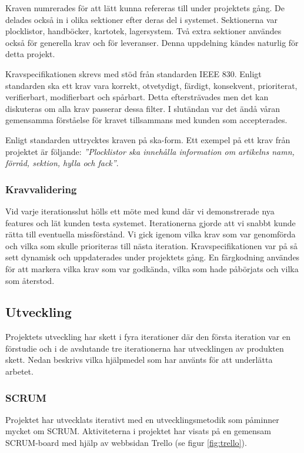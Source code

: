\documentclass{article}
\begin{document}
Kraven numrerades för att lätt kunna refereras till under projektets gång. De delades också in i olika sektioner efter deras del i systemet. Sektionerna var plocklistor, handböcker, kartotek, lagersystem. Två extra sektioner användes också för generella krav och för leveranser. Denna uppdelning kändes naturlig för detta projekt. 

Kravspecifikationen skrevs med stöd från standarden IEEE 830. Enligt standarden ska ett krav vara korrekt, otvetydigt, färdigt, konsekvent, prioriterat, verifierbart, modifierbart och spårbart. Detta eftersträvades men det kan diskuteras om alla krav passerar dessa filter. I slutändan var det ändå våran gemensamma förståelse för kravet tillsammans med kunden som accepterades. 

Enligt standarden uttrycktes kraven på ska-form. Ett exempel på ett krav från projektet är följande: \textit{''Plocklistor ska innehålla information om artikelns namn, förråd, sektion, hylla och fack''}.

\subsubsection{Kravvalidering}
Vid varje iterationsslut hölls ett möte med kund där vi demonstrerade nya features och lät kunden testa systemet. Iterationerna gjorde att vi snabbt kunde rätta till eventuella missförstånd. Vi gick igenom vilka krav som var genomförda och vilka som skulle prioriteras till nästa iteration. Kravspecifikationen var på så sett dynamisk och uppdaterades under projektets gång. En färgkodning användes för att markera vilka krav som var godkända, vilka som hade påbörjats och vilka som återstod.

\subsection{Utveckling}
Projektets utveckling har skett i fyra iterationer där den första iteration var en förstudie och i de avslutande tre iterationerna har utvecklingen av produkten skett. Nedan beskrivs vilka hjälpmedel som har använts för att underlätta arbetet.
		
\subsubsection{SCRUM}
Projektet har utvecklats iterativt med en utvecklingsmetodik som påminner mycket om SCRUM. Aktiviteterna i projektet har visats på en gemensam SCRUM-board med hjälp av webbsidan Trello (se figur \ref{fig:trello}). 
\end{document}
